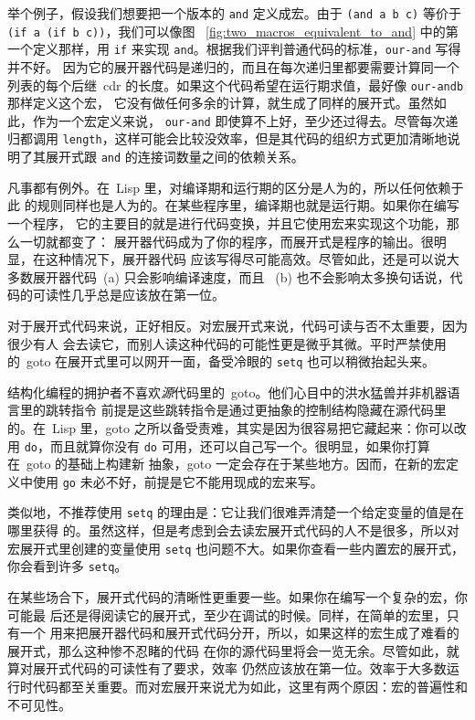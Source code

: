 举个例子，假设我们想要把一个版本的 \verb|and| 定义成宏。由于
 \verb|(and a b c)| 等价于 \verb|(if a (if b c))|，我们可以像图
~\ref{fig:two_macros_equivalent_to_and} 中的第一个定义那样，用 \verb|if| 来实现
 \verb|and|。根据我们评判普通代码的标准，\verb|our-and| 写得并不好。
因为它的展开器代码是递归的，而且在每次递归里都要需要计算同一个列表的每个后继~cdr
的长度。如果这个代码希望在运行期求值，最好像 \verb|our-andb| 那样定义这个宏，
它没有做任何多余的计算，就生成了同样的展开式。虽然如此，作为一个宏定义来说，
 \verb|our-and| 即使算不上好，至少还过得去。尽管每次递归都调用
 \verb|length|，这样可能会比较没效率，但是其代码的组织方式更加清晰地说明了其展开式跟
 \verb|and| 的连接词数量之间的依赖关系。

凡事都有例外。在~Lisp 里，对编译期和运行期的区分是人为的，所以任何依赖于此
的规则同样也是人为的。在某些程序里，编译期也就是运行期。如果你在编写一个程序，
它的主要目的就是进行代码变换，并且它使用宏来实现这个功能，那么一切就都变了：
展开器代码成为了你的程序，而展开式是程序的输出。很明显，在这种情况下，展开器代码
应该写得尽可能高效。尽管如此，还是可以说大多数展开器代码~(a) 只会影响编译速度，而且
~(b) 也不会影响太多\pozhehao{}换句话说，代码的可读性几乎总是应该放在第一位。

对于展开式代码来说，正好相反。对宏展开式来说，代码可读与否不太重要，因为很少有人
会去读它，而别人读这种代码的可能性更是微乎其微。平时严禁使用的~goto 在展开式里可以网开一面，备受冷眼的
 \verb|setq| 也可以稍微抬起头来。

结构化编程的拥护者不喜欢\emph{源}代码里的~goto。他们心目中的洪水猛兽并非机器语言里的跳转指令\pozhehao{}
前提是这些跳转指令是通过更抽象的控制结构隐藏在源代码里的。在~Lisp 里，goto
之所以备受责难，其实是因为很容易把它藏起来：你可以改用 \verb|do|，而且就算你没有
 \verb|do| 可用，还可以自己写一个。很明显，如果你打算在~goto 的基础上构建新
抽象，goto 一定会存在于某些地方。因而，在新的宏定义中使用 \verb|go| 未必不好，前提是它不能用现成的宏来写。

类似地，不推荐使用 \verb|setq| 的理由是：它让我们很难弄清楚一个给定变量的值是在哪里获得
的。虽然这样，但是考虑到会去读宏展开式代码的人不是很多，所以对宏展开式里创建的变量使用
 \verb|setq| 也问题不大。如果你查看一些内置宏的展开式，你会看到许多 \verb|setq|。

在某些场合下，展开式代码的清晰性更重要一些。如果你在编写一个复杂的宏，你可能最
后还是得阅读它的展开式，至少在调试的时候。同样，在简单的宏里，只有一个\bq{}
用来把展开器代码和展开式代码分开，所以，如果这样的宏生成了难看的展开式，那么这种惨不忍睹的代码
在你的源代码里将会一览无余。尽管如此，就算对展开式代码的可读性有了要求，效率
仍然应该放在第一位。效率于大多数运行时代码都至关重要。而对宏展开来说尤为如此，这里有两个原因：宏的普遍性和不可见性。

